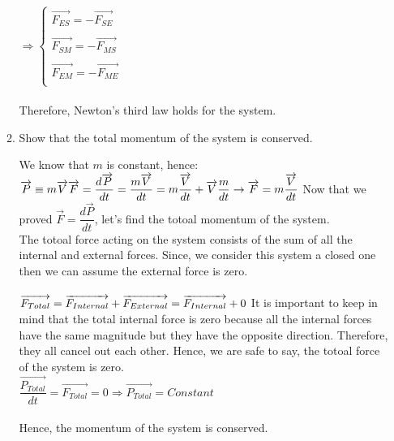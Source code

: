 \documentclass[fleqn]{article}
\begin{document}
\begin{enumerate}
\begin{enumerate}
      \textcolor{hwColor}{
        $
          \Longrightarrow \begin{cases}
            \overrightarrow{F_{ES}}=-\overrightarrow{F_{SE}} \\
            \\
            \overrightarrow{F_{SM}}=-\overrightarrow{F_{MS}} \\
            \\
            \overrightarrow{F_{EM}}=-\overrightarrow{F_{ME}} \\
          \end{cases}
        $
        \\
        \\
        Therefore, Newton’s third law holds for the system.
      }


      \item Show that the total momentum of the system is conserved.
      
        \textcolor{hwColor}{
          We know that $m$ is constant, hence: \\
          $
            \overrightarrow{P}\equiv m\overrightarrow{V} \\ \\
            \overrightarrow{F}=\dfrac{d\overrightarrow{P}}{dt}=\dfrac{m\overrightarrow{V}}{dt}=m\dfrac{\overrightarrow{V}}{dt}+\overrightarrow{V}\dfrac{m}{dt} \rightarrow \overrightarrow{F}=m\dfrac{\overrightarrow{V}}{dt} \\ \\
          $
          Now that we proved $\overrightarrow{F}=\dfrac{d\overrightarrow{P}}{dt}$, let's find the totoal momentum of the system. \\
          The totoal force acting on the system consists of the sum of all the internal and external forces. Since, we consider this system
          a closed one then we can assume the external force is zero. \\
          \\
          $
            \overrightarrow{F_{Total}}=\overrightarrow{F_{Internal}}+\overrightarrow{F_{External}}=\overrightarrow{F_{Internal}}+0 \\ \\
          $
          It is important to keep in mind that the total internal force is zero because all the internal forces have the same magnitude but they have the opposite direction. 
          Therefore, they all cancel out each other. Hence, we are safe to say, the totoal force of the system is zero. \\
          $
            \dfrac{\overrightarrow{P_{Total}}}{dt}=\overrightarrow{F_{Total}}=0 \Rightarrow \overrightarrow{P_{Total}}=Constant 
          $ \\
          \\
          Hence, the momentum of the system is conserved.
        }


\end{enumerate}
\end{enumerate}
\end{document}
